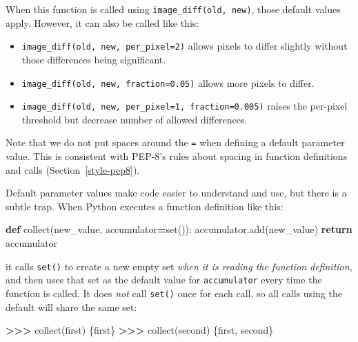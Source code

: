 \documentclass[
]{krantz}
\makeatletter
\newenvironment{Shaded}{\begin{snugshade}}{\end{snugshade}}
\newcommand{\BuiltInTok}[1]{#1}
\newcommand{\ControlFlowTok}[1]{\textcolor[rgb]{0.13,0.29,0.53}{\textbf{#1}}}
\newcommand{\KeywordTok}[1]{\textcolor[rgb]{0.13,0.29,0.53}{\textbf{#1}}}
\newcommand{\NormalTok}[1]{#1}
\newcommand{\OperatorTok}[1]{\textcolor[rgb]{0.81,0.36,0.00}{\textbf{#1}}}
\newcommand{\StringTok}[1]{\textcolor[rgb]{0.31,0.60,0.02}{#1}}
\providecommand{\tightlist}{%
  \setlength{\itemsep}{0pt}\setlength{\parskip}{0pt}}
\newenvironment{kframe}{%
\medskip{}
\setlength{\fboxsep}{.8em}
 \def\at@end@of@kframe{}%
 \ifinner\ifhmode%
  \def\at@end@of@kframe{\end{minipage}}%
  \begin{minipage}{\columnwidth}%
 \fi\fi%
 \def\FrameCommand##1{\hskip\@totalleftmargin \hskip-\fboxsep
 \colorbox{shadecolor}{##1}\hskip-\fboxsep
     \hskip-\linewidth \hskip-\@totalleftmargin \hskip\columnwidth}%
 \MakeFramed {\advance\hsize-\width
   \@totalleftmargin\z@ \linewidth\hsize
   \@setminipage}}%
 {\par\unskip\endMakeFramed%
 \at@end@of@kframe}
\renewenvironment{Shaded}{\begin{kframe}}{\end{kframe}}
\makeatother
\begin{document}
When this function is called using \texttt{image\_diff(old,\ new)},
those default values apply.
However,
it can also be called like this:

\begin{itemize}
\tightlist
\item
  \texttt{image\_diff(old,\ new,\ per\_pixel=2)}
  allows pixels to differ slightly without those differences being significant.
\item
  \texttt{image\_diff(old,\ new,\ fraction=0.05)} allows more pixels to differ.
\item
  \texttt{image\_diff(old,\ new,\ per\_pixel=1,\ fraction=0.005)}
  raises the per-pixel threshold but decrease number of allowed differences.
\end{itemize}

Note that we do not put spaces around the \texttt{=} when defining a default parameter value.
This is consistent with PEP-8's rules about spacing in function definitions and calls
(Section~\ref{style-pep8}).

Default parameter values make code easier to understand and use,
but there is a subtle trap.
When Python executes a function definition like this:

\begin{Shaded}
\begin{Highlighting}[]
\KeywordTok{def}\NormalTok{ collect(new\_value, accumulator}\OperatorTok{=}\BuiltInTok{set}\NormalTok{()):}
\NormalTok{    accumulator.add(new\_value)}
    \ControlFlowTok{return}\NormalTok{ accumulator}
\end{Highlighting}
\end{Shaded}

it calls \texttt{set()} to create a new empty set
\emph{when it is reading the function definition},
and then uses that set as the default value for \texttt{accumulator}
every time the function is called.
It does \emph{not} call \texttt{set()} once for each call,
so all calls using the default will share the same set:

\begin{Shaded}
\begin{Highlighting}[]
\OperatorTok{\textgreater{}\textgreater{}\textgreater{}}\NormalTok{ collect(}\StringTok{\textquotesingle{}first\textquotesingle{}}\NormalTok{)}
\NormalTok{\{}\StringTok{\textquotesingle{}first\textquotesingle{}}\NormalTok{\}}
\OperatorTok{\textgreater{}\textgreater{}\textgreater{}}\NormalTok{ collect(}\StringTok{\textquotesingle{}second\textquotesingle{}}\NormalTok{)}
\NormalTok{\{}\StringTok{\textquotesingle{}first\textquotesingle{}}\NormalTok{, }\StringTok{\textquotesingle{}second\textquotesingle{}}\NormalTok{\}}
\end{Highlighting}
\end{Shaded}
\end{document}
